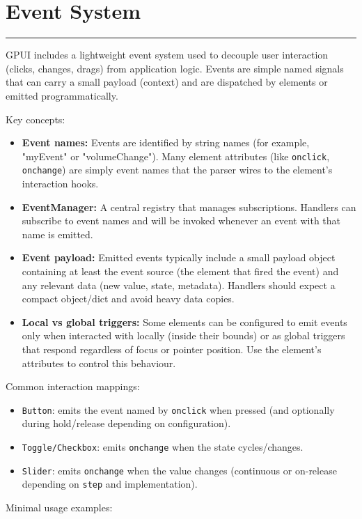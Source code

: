 \documentclass[a4paper,11pt]{article}
\begin{document}
\section*{Event System}
\vspace{-1.2em}
\rule{\linewidth}{0.4pt}
GPUI includes a lightweight event system used to decouple user interaction (clicks, changes, drags) from application logic. Events are simple named signals that can carry a small payload (context) and are dispatched by elements or emitted programmatically.

Key concepts:
\begin{itemize}
    \item \textbf{Event names:} Events are identified by string names (for example, "myEvent" or "volumeChange"). Many element attributes (like \texttt{onclick}, \texttt{onchange}) are simply event names that the parser wires to the element's interaction hooks.
    \item \textbf{EventManager:} A central registry that manages subscriptions. Handlers can subscribe to event names and will be invoked whenever an event with that name is emitted.
    \item \textbf{Event payload:} Emitted events typically include a small payload object containing at least the event source (the element that fired the event) and any relevant data (new value, state, metadata). Handlers should expect a compact object/dict and avoid heavy data copies.
    \item \textbf{Local vs global triggers:} Some elements can be configured to emit events only when interacted with locally (inside their bounds) or as global triggers that respond regardless of focus or pointer position. Use the element's attributes to control this behaviour.
\end{itemize}

Common interaction mappings:
\begin{itemize}
    \item \texttt{Button}: emits the event named by \texttt{onclick} when pressed (and optionally during hold/release depending on configuration).
    \item \texttt{Toggle/Checkbox}: emits \texttt{onchange} when the state cycles/changes.
    \item \texttt{Slider}: emits \texttt{onchange} when the value changes (continuous or on-release depending on \texttt{step} and implementation).
\end{itemize}

Minimal usage examples:
\end{document}
